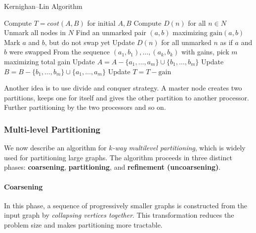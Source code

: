 \documentclass[12pt]{book}
\begin{document}
\begin{algorithm}[H]
\caption{Kernighan--Lin Algorithm}
\label{alg:kernighan-lin}
\begin{algorithmic}[1]
    \State Compute $T = cost(A,B)$ for initial $A,B$ 
    \Repeat
        \State Compute $D(n)$ for all $n \in N$ 
        \State Unmark all nodes in $N$ 
         
            \State Find an unmarked pair $(a,b)$ maximizing $\text{gain}(a,b)$ 
            \State Mark $a$ and $b$, but do not swap yet 
            \State Update $D(n)$ for all unmarked $n$ as if $a$ and $b$ were swapped 
        \EndWhile
        \State From the sequence $(a_1,b_1),\ldots,(a_k,b_k)$ with gains, pick $m$ maximizing total gain 
            \State Update $A = A - \{a_1,\ldots,a_m\} \cup \{b_1,\ldots,b_m\}$ 
            \State Update $B = B - \{b_1,\ldots,b_m\} \cup \{a_1,\ldots,a_m\}$ 
            \State Update $T = T - \text{gain}$ 
        \EndIf
\EndFunction
\end{algorithmic}
\end{algorithm}

Another idea is to use divide and conquer strategy. A master node creates two partitions, keeps one for itself and gives the other partition to another processor. Further partitioning by the two processors and so on.

\subsubsection{Multi-level Partitioning}
We now describe an algorithm for \emph{$k$-way multilevel partitioning}, which is widely used for partitioning large graphs. The algorithm proceeds in three distinct phases: \textbf{coarsening}, \textbf{partitioning}, and \textbf{refinement (uncoarsening)}.

\paragraph{Coarsening}
In this phase, a sequence of progressively smaller graphs is constructed from the input graph by \emph{collapsing vertices together}. This transformation reduces the problem size and makes partitioning more tractable.  
\end{document}

